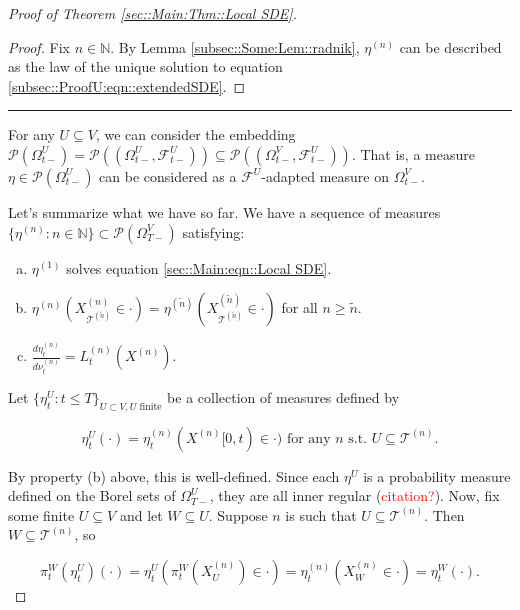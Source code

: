 \documentclass[12pt]{article}
\newcommand{\mb}{\mathbb}
\newcommand{\mc}{\mathcal}
\newcommand{\te}{\text}
\newcommand{\tr}{\textcolor{red}}
\newcommand{\ind}{\hspace{24pt}}
\newcommand{\lin}{\rule{\linewidth}{0.4 pt}}
\newcommand{\pmsr}{\mc{P}}							%
\renewcommand{\U}{U}							%
\newcommand{\UU}{W}								%
\newcommand{\T}{T}								%
\renewcommand{\t}{t}							%
\newcommand{\sset}{\Omega}						%
\newcommand{\proj}{\pi}							%
\renewcommand{\tt}{s}							%
\newcommand{\F}{\mc{F}}							%
\newcommand{\X}{X}								%
\newcommand{\vind}[1]{^{#1}}					%
\newcommand{\vsi}[1]{^{#1}}						%
\newcommand{\cind}[1]{_{#1}}					%
\newcommand{\tip}[1]{#1}						%
\newcommand{\ts}[1]{_{#1}}						%
\newcommand{\tree}{\mc{T}}						%
\newcommand{\sln}[1]{^{(#1)}}					%
\newcommand{\alt}[1]{\widetilde{#1}}			%
\newcommand{\mm}{\nu}							%
\newcommand{\mmm}{\eta}							%
\newcommand{\dense}{L}							%
\begin{document}
\begin{proof}[Proof of Theorem \ref{sec::Main:Thm::Local SDE}]
\begin{proof}
\ind Fix \(n\in\mb{N}\). By Lemma \ref{subsec::Some:Lem::radnik}, \(\mmm\sln{n}\) can be described as the law of the unique solution to equation \eqref{subsec::ProofU:eqn::extendedSDE}.
\end{proof}

\lin

For any \(\U\subseteq V\), we can consider the embedding \(\pmsr\left(\sset\vsi{\U}\ts{\t-}\right) = \pmsr\left((\sset\vsi{\U}\ts{\t-},\F\vsi{\U}\ts{\t-})\right) \subseteq \pmsr\left((\sset\vsi{V}\ts{\t-},\F\vsi{\U}\ts{\t-})\right)\). That is, a measure \(\mmm\in \pmsr\left(\sset\vsi{\U}\ts{\t-}\right)\) can be considered as a \(\F\vsi{\U}\)-adapted measure on \(\sset\vsi{V}\ts{\t-}\).

\ind Let's summarize what we have so far. We have a sequence of measures \(\{\mmm\sln{n}:n\in\mb{N}\} \subset \pmsr(\sset\vsi{V}\ts{\T-})\) satisfying:

\begin{enumerate}[(a)]
\item \(\mmm\sln{1}\) solves equation \eqref{sec::Main:eqn::Local SDE}.

\item \(\mmm\sln{n}(\X\sln{n}\cind{\tree\sln{\alt{n}}} \in \cdot) = \mmm\sln{\alt{n}}(\X\sln{\alt{n}}\cind{\tree\sln{\alt{n}}}\in \cdot)\) for all \(n \geq \alt{n}\).

\item \(\frac{d\mmm\sln{n}\ts{\t}}{d\mm\sln{n}\ts{\t}} = \dense\sln{n}\ts{\t}(\X\sln{n})\).
\end{enumerate}

Let \(\{\mmm\vind{\U}\ts{\t}:\t \leq \T\}_{\U\subset V,\U\te{ finite}}\) be a collection of measures defined by

\[\mmm\vind{\U}\ts{\t}(\cdot) = \mmm\sln{n}\ts{\t}(\X\sln{n}\tip{[0,\t)} \in \cdot) \te{ for any }n\te{ \tt.\t. }\U \subseteq \tree\sln{n}.\]

By property (b) above, this is well-defined. Since each \(\mmm\vind{\U}\) is a probability measure defined on the Borel sets of \(\sset\vsi{\U}\ts{\T-}\), they are all inner regular (\tr{citation?}). Now, fix some finite \(\U\subseteq V\) and let \(\UU \subseteq \U\). Suppose \(n\) is such that \(\U \subseteq \tree\sln{n}\). Then \(\UU\subseteq \tree\sln{n}\), so

\[\proj\vsi{\UU}\ts{\t}(\mmm\vind{\U}\ts{\t})(\cdot) = \mmm\vind{\U}\ts{\t}\left(\proj\vsi{\UU}\ts{\t}(\X\sln{n}\cind{\U}) \in \cdot\right) = \mmm\sln{n}\ts{\t}\left(\X\sln{n}\cind{\UU} \in \cdot\right) = \mmm\vind{\UU}\ts{\t}(\cdot).\]


\end{proof}
\end{document}
